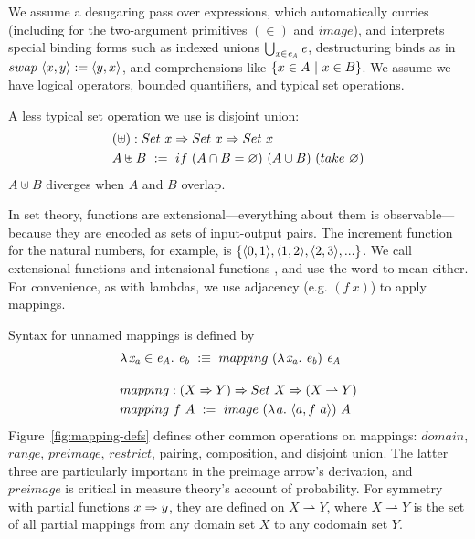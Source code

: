 \documentclass[preprint]{sigplanconf}
\newcommand{\pto}{\rightharpoonup}
\begin{document}
We assume a desugaring pass over \lzfclang expressions, which automatically curries (including for the two-argument primitives $(\in)$ and $image$), and interprets special binding forms such as indexed unions $\textstyle\bigcup_{\mathit{x} \in \mathit{e_A}}\mathit{e}$, destructuring binds as in $swap~\langle{x,y}\rangle := \langle{y,x}\rangle$, and comprehensions like $\lbrace {x \in A} \ \lvert\ {x \in B} \rbrace$.
We assume we have logical operators, bounded quantifiers, and typical set operations.

A less typical set operation we use is disjoint union:
\begin{equation}
\begin{aligned}
	&(\uplus) : Set~x \Rightarrow Set~x \Rightarrow Set~x \\
	&A \uplus B \ := \ if~(A \cap B = \varnothing)~(A \cup B)~(take~\varnothing)
\end{aligned}
\end{equation}
$A \uplus B$ diverges when $A$ and $B$ overlap.

In set theory, functions are extensional---everything about them is observable---because they are encoded as sets of input-output pairs.
The increment function for the natural numbers, for example, is $\{{\langle{0,1}\rangle,\langle{1,2}\rangle,\langle{2,3}\rangle,...}\}$.
We call extensional functions  and intensional functions , and use the word  to mean either.
For convenience, as with lambdas, we use adjacency (e.g. $(f~x)$) to apply mappings.

Syntax for unnamed mappings is defined by
\begin{align}
	&\fun{\mathit{x_a} \in \mathit{e_A}}{\mathit{e_b}} \ :\equiv\ mapping~(\fun{\mathit{x_a}}\mathit{e_b})~\mathit{e_A} \\
\nonumber\\[-6pt]
	&\begin{aligned}
		&mapping : (X \tto Y) \tto Set~X \tto (X \pto Y) \\
		&mapping~f~A \ := \ image~(\fun{a}{\pair{a,f~a}})~A
	\end{aligned}
\end{align}
Figure~\ref{fig:mapping-defs} defines other common operations on mappings: $domain$, $range$, $preimage$, $restrict$, pairing, composition, and disjoint union.
The latter three are particularly important in the preimage arrow's derivation, and $preimage$ is critical in measure theory's account of probability.
For symmetry with partial functions $x \Rightarrow y$, they are defined on $X \pto Y$, where $X \pto Y$ is the set of all partial mappings from any domain set $X$ to any codomain set $Y$.
\end{document}
